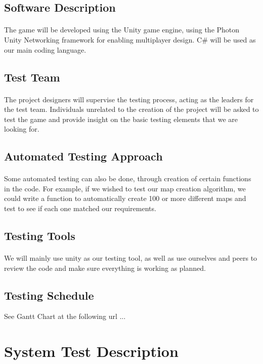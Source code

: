 \documentclass[12pt, titlepage]{article}
\begin{document}
\subsection{Software Description}
\paragraph{}The game will be developed using the Unity game engine, using the Photon Unity Networking framework for enabling multiplayer design. C# will be used as our main coding language.
\subsection{Test Team}
\paragraph{}The project designers will supervise the testing process, acting as the leaders for the test team. Individuals unrelated to the creation of the project will be asked to test the game and provide insight on the basic testing elements that we are looking for. 
\subsection{Automated Testing Approach}
\paragraph{}Some automated testing can also be done, through creation of certain functions in the code. For example, if we wished to test our map creation algorithm, we could write a function to automatically create 100 or more different maps and test to see if each one matched our requirements. 
\subsection{Testing Tools}
\paragraph{}We will mainly use unity as our testing tool, as well as use ourselves and peers to review the code and make sure everything is working as planned.
\subsection{Testing Schedule}
		
See Gantt Chart at the following url ...
\section{System Test Description}
	
\end{document}
